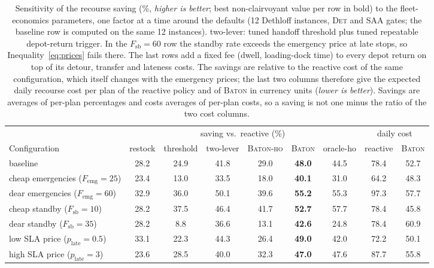 \begin{table}[t]
\caption{Sensitivity of the recourse saving (\%, \emph{higher is
better}; best non-clairvoyant value per row in bold) to the fleet-economics
parameters, one factor at a time around the defaults (12 Dethloff
instances, \textsc{Det} and \textsc{SAA} gates; the baseline row is
computed on the same 12 instances). two-lever: tuned handoff threshold
plus tuned repeatable depot-return trigger. In the
$F_{\mathrm{sb}} = 60$ row the standby rate exceeds the emergency price
at late stops, so Inequality~\eqref{eq:prices} fails there. The last
rows add a fixed fee (dwell, loading-dock time) to every depot return on
top of its detour, transfer and lateness costs. The savings are relative
to the reactive cost of the same configuration, which itself changes with
the emergency prices; the last two columns therefore give the expected
daily recourse cost per plan of the reactive policy and of
\textsc{Baton} in currency units (\emph{lower is better}). Savings
are averages of per-plan percentages and costs averages of per-plan
costs, so a saving is not one minus the ratio of the two cost columns.}
\label{tab:costsens}
\centering
\footnotesize
\setlength{\tabcolsep}{4pt}
\begin{adjustbox}{max width=\linewidth}
\begin{tabular}{l cccccc cc}
\toprule
& \multicolumn{6}{c}{saving vs.\ reactive (\%)} & \multicolumn{2}{c}{daily cost} \\
\cmidrule(lr){2-7}\cmidrule(lr){8-9}
Configuration & restock & threshold & two-lever & \textsc{Baton-ho} &
\textsc{Baton} & oracle-ho & reactive & \textsc{Baton} \\
\midrule
baseline & 28.2 & 24.9 & 41.8 & 29.0 & \textbf{48.0} & 44.5 & 78.4 & 52.7 \\
cheap emergencies ($F_{\mathrm{emg}}{=}25$) & 23.4 & 13.0 & 33.5 & 18.0 & \textbf{40.1} & 31.0 & 64.2 & 48.3 \\
dear emergencies ($F_{\mathrm{emg}}{=}60$) & 32.9 & 36.0 & 50.1 & 39.6 & \textbf{55.2} & 55.3 & 97.3 & 57.7 \\
cheap standby ($F_{\mathrm{sb}}{=}10$) & 28.2 & 37.5 & 46.4 & 41.7 & \textbf{52.7} & 57.7 & 78.4 & 45.8 \\
dear standby ($F_{\mathrm{sb}}{=}35$) & 28.2 & 8.8 & 36.6 & 13.1 & \textbf{42.6} & 24.8 & 78.4 & 60.9 \\
low SLA price ($p_{\mathrm{late}}{=}0.5$) & 33.1 & 22.3 & 44.3 & 26.4 & \textbf{49.0} & 42.0 & 72.2 & 50.1 \\
high SLA price ($p_{\mathrm{late}}{=}3$) & 23.6 & 28.5 & 40.0 & 32.3 & \textbf{47.0} & 47.6 & 87.7 & 55.8 \\

\end{tabular}
\end{adjustbox}
\end{table}
